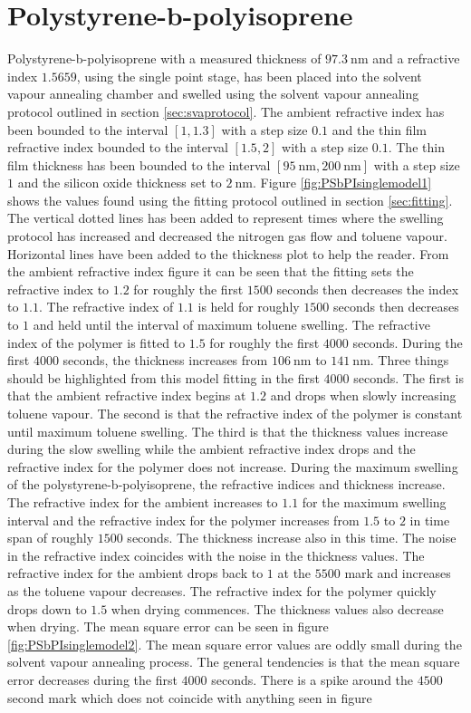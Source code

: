 \documentclass[MasterThesisMain.tex]{subfiles}
\begin{document}
\section{Polystyrene-b-polyisoprene} 
Polystyrene-b-polyisoprene with a measured thickness of $\SI{97.3}{\nano\meter}$ and a refractive index $1.5659$, using the single point stage, has been placed into the solvent vapour annealing chamber and swelled using the solvent vapour annealing protocol outlined in section \ref{sec:svaprotocol}. The ambient refractive index has been bounded to the interval $[1,1.3]$ with a step size $0.1$ and the thin film refractive index bounded to the interval $[1.5,2]$ with a step size $0.1$. The thin film thickness has been bounded to the interval $[\SI{95}{\nano\meter},\SI{200}{\nano\meter}]$ with a step size $1$ and the silicon oxide thickness set to $\SI{2}{\nano\meter}$. Figure \ref{fig:PSbPIsinglemodel1} shows the values found using the fitting protocol outlined in section \ref{sec:fitting}. The vertical dotted lines has been added to represent times where the swelling protocol has increased and decreased the nitrogen gas flow and toluene vapour. Horizontal lines have been added to the thickness plot to help the reader. From the ambient refractive index figure it can be seen that the fitting sets the refractive index to $1.2$ for roughly the first $1500$ seconds then decreases the index to $1.1$. The refractive index of $1.1$ is held for roughly $1500$ seconds then decreases to $1$ and held until the interval of maximum toluene swelling. The refractive index of the polymer is fitted to $1.5$ for roughly the first $4000$ seconds. During the first $4000$ seconds, the thickness increases from $\SI{106}{\nano\meter}$ to $\SI{141}{\nano\meter}$. Three things should be highlighted from this model fitting in the first $4000$ seconds. The first is that the ambient refractive index begins at $1.2$ and drops when slowly increasing toluene vapour. The second is that the refractive index of the polymer is constant until maximum toluene swelling. The third is that the thickness values increase during the slow swelling while the ambient refractive index drops and the refractive index for the polymer does not increase. During the maximum swelling of the polystyrene-b-polyisoprene, the refractive indices and thickness increase. The refractive index for the ambient increases to $1.1$ for the maximum swelling interval and the refractive index for the polymer increases from $1.5$ to $2$ in time span of roughly $1500$ seconds. The thickness increase also in this time. The noise in the refractive index coincides with the noise in the thickness values. The refractive index for the ambient drops back to $1$ at the $5500$ mark and increases as the toluene vapour decreases. The refractive index for the polymer quickly drops down to $1.5$ when drying commences. The thickness values also decrease when drying. The mean square error can be seen in figure \ref{fig:PSbPIsinglemodel2}. The mean square error values are oddly small during the solvent vapour annealing process. The general tendencies is that the mean square error decreases during the first $4000$ seconds. There is a spike around the $4500$ second mark which does not coincide with anything seen in figure 
\end{document}
